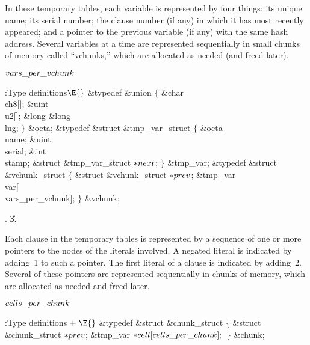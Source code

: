 In these temporary tables, each variable is represented by four things:
its unique name; its serial number; the clause number (if any) in which it has
most recently appeared; and a pointer to the previous variable (if any)
with the same hash address. Several variables at a time
are represented sequentially in small chunks of memory called ``vchunks,''
which are allocated as needed (and freed later).

\Y\B\4\D$\\{vars\_per\_vchunk}$ \5
\par
\Y\B\4:Type definitions\X${}\E{}$\6
\&{typedef} \&{union} ${}\{{}$\1\6
\&{char} \\{ch8}[];\6
\&{uint} \\{u2}[];\6
\&{long} \&{long} \\{lng};\2\6
${}\}{}$ \&{octa};\6
\&{typedef} \&{struct} \&{tmp\_var\_struct} ${}\{{}$\1\6
\&{octa} \\{name};\6
\&{uint} \\{serial};\6
\&{int} \\{stamp};\6
\&{struct} \&{tmp\_var\_struct} ${}{*}\\{next}{}$;\2%
\6
${}\}{}$ \&{tmp\_var};\7
\&{typedef} \&{struct} \&{vchunk\_struct} ${}\{{}$\1\6
\&{struct} \&{vchunk\_struct} ${}{*}\\{prev}{}$;\6
\&{tmp\_var} \\{var}[\\{vars\_per\_vchunk}];\2\6
${}\}{}$ \&{vchunk};\par
{}.
\U3.\fi

Each clause in the temporary tables is represented by a
sequence of
one or more pointers to the  nodes of the literals involved.
A negated literal is indicated by adding~1 to such a pointer.
The first literal of a clause is indicated by adding~2.
Several of these pointers are represented sequentially in chunks
of memory, which are allocated as needed and freed later.

\Y\B\4\D$\\{cells\_per\_chunk}$ \5
\par
\Y\B\4:Type definitions\X${}\mathrel+\E{}$\6
\&{typedef} \&{struct} \&{chunk\_struct} ${}\{{}$\1\6
\&{struct} \&{chunk\_struct} ${}{*}\\{prev}{}$;\6
\&{tmp\_var} ${}{*}\\{cell}[\\{cells\_per\_chunk}];{}$\2\6
${}\}{}$ \&{chunk};\par
\fi

